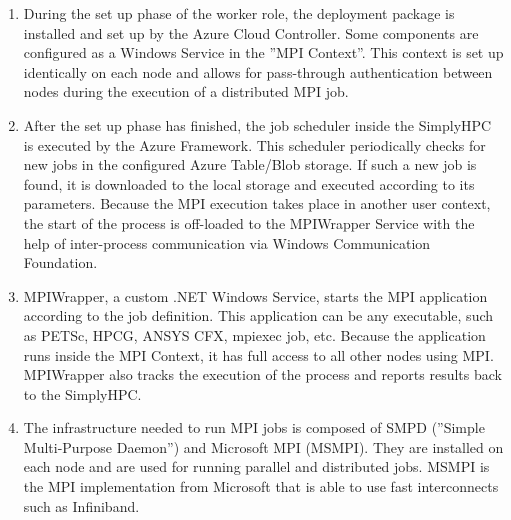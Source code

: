 \documentclass[a4paper,twoside]{article}
\begin{document}
\begin{enumerate}
	\item During the set up phase of the worker role, the deployment package is installed and set up by the Azure Cloud Controller. Some components are configured as a Windows Service in the ''MPI Context''. This context is set up identically on each node and allows for pass-through authentication between nodes during the execution of a distributed MPI job.

	\item After the set up phase has finished, the job scheduler inside the SimplyHPC is executed by the Azure Framework. This scheduler periodically checks for new jobs in the configured Azure Table/Blob storage. If such a new job is found, it is downloaded to the local storage and executed according to its parameters. Because the MPI execution takes place in another user context, the start of the process is off-loaded to the MPIWrapper Service with the help of inter-process communication via Windows Communication Foundation.

	\item MPIWrapper, a custom .NET Windows Service, starts the MPI application according to the job definition. This application can be any executable, such as PETSc, HPCG, ANSYS CFX, mpiexec job, etc. Because the application runs inside the MPI Context, it has full access to all other nodes using MPI. MPIWrapper also tracks the execution of the process and reports results back to the SimplyHPC.

	\item The infrastructure needed to run MPI jobs is composed of SMPD (''Simple Multi-Purpose Daemon'') and Microsoft MPI (MSMPI). They are installed on each node and are used for running parallel and distributed jobs. MSMPI is the MPI implementation from Microsoft that is able to use fast interconnects such as Infiniband.
\end{enumerate}
\end{document}
